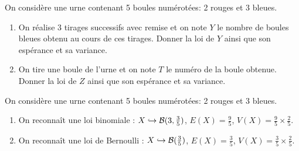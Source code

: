 \documentclass[a4paper, 11pt,reqno]{article}
\begin{document}
\begin{exercice}  \;
	On consid\`ere une urne contenant 5 boules num\'erot\'ees: 2 rouges et 3 bleues.
	\begin{enumerate}
		\item On r\'ealise 3 tirages successifs avec remise et on note $Y$ le nombre de boules bleues obtenu au cours de ces tirages. Donner la loi de $Y$ ainsi que son esp\'erance et sa variance.
		\item On tire une boule de l'urne et on note $T$ le num\'ero de la boule obtenue. Donner la loi de $Z$ ainsi que son esp\'erance et sa variance.
	\end{enumerate}
\end{exercice}
\begin{correction}  \;
	On consid\`ere une urne contenant 5 boules num\'erot\'ees: 2 rouges et 3 bleues.
	\begin{enumerate}
		\item On reconna\^it une loi binomiale : $X \hookrightarrow \mathcal{B}(3,\frac{3}{5})$, $E(X) = \frac{9}{5}$, $V(X) = \frac{9}{5} \times \frac{2}{5}$.
		\item On reconna\^it une loi de Bernoulli  : $X \hookrightarrow \mathcal{B}(\frac{3}{5})$, $E(X) = \frac{3}{5}$, $V(X) = \frac{3}{5} \times \frac{2}{5}$.
	\end{enumerate}
\end{correction}
\end{document}
